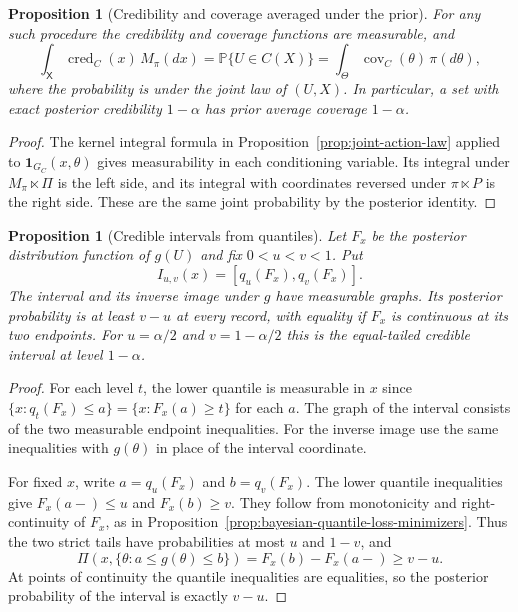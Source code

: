 \documentclass[11pt,oneside]{book}
\newtheorem{proposition}[theorem]{Proposition}
\theoremstyle{definition}
\theoremstyle{remark}
\begin{document}
\begin{proposition}[Credibility and coverage averaged under the prior]
\label{prop:bayesian-credibility-coverage-average}
For any such procedure the credibility and coverage functions
are measurable, and
\begin{equation}
\int_{\mathsf X}\operatorname{cred}_C(x)\,M_\pi(dx)
=\mathbb P\{U\in C(X)\}
=\int_\Theta\operatorname{cov}_C(\theta)\,\pi(d\theta),
\label{eq:bayesian-credibility-coverage-average}
\end{equation}
where the probability is under the joint law of $(U,X)$.
In particular, a set with exact posterior credibility $1-\alpha$
has prior average coverage $1-\alpha$.
\end{proposition}
\begin{proof}
The kernel integral formula in Proposition~\ref{prop:joint-action-law}
applied to $\mathbf 1_{G_C}(x,\theta)$ gives measurability in
each conditioning variable. Its integral under $M_\pi\ltimes\Pi$
is the left side, and its integral with coordinates reversed
under $\pi\ltimes P$ is the right side. These are the same
joint probability by the posterior identity.
\end{proof}

\begin{proposition}[Credible intervals from quantiles]
\label{prop:bayesian-credible-quantile-interval}
Let $F_x$ be the posterior distribution function of $g(U)$ and
fix $0<u<v<1$. Put
\[
I_{u,v}(x)=[q_u(F_x),q_v(F_x)].
\]
The interval and its inverse image under $g$ have measurable
graphs. Its posterior probability is at least $v-u$ at every
record, with equality if $F_x$ is continuous at its two endpoints.
For $u=\alpha/2$ and $v=1-\alpha/2$ this is the
\emph{equal-tailed credible interval} at level $1-\alpha$.
\end{proposition}
\begin{proof}
For each level $t$, the lower quantile is measurable in $x$ since
$\{x:q_t(F_x)\leq a\}=\{x:F_x(a)\geq t\}$ for each $a$.
The graph of the interval consists of the two measurable
endpoint inequalities. For the inverse image use the same
inequalities with $g(\theta)$ in place of the interval coordinate.

For fixed $x$, write $a=q_u(F_x)$ and $b=q_v(F_x)$. The lower
quantile inequalities give $F_x(a-)\leq u$ and $F_x(b)\geq v$.
They follow from monotonicity and right-continuity of $F_x$,
as in Proposition~\ref{prop:bayesian-quantile-loss-minimizers}.
Thus the two strict tails have probabilities at most $u$ and
$1-v$, and
\[
\Pi(x,\{\theta:a\leq g(\theta)\leq b\})=F_x(b)-F_x(a-)\geq v-u.
\]
At points of continuity the quantile inequalities are equalities,
so the posterior probability of the interval is exactly $v-u$.
\end{proof}
\end{document}
